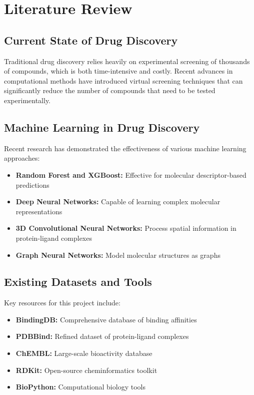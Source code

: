 \documentclass[12pt,a4paper]{article}
\begin{document}
\section{Literature Review}

\subsection{Current State of Drug Discovery}
Traditional drug discovery relies heavily on experimental screening of thousands of compounds, which is both time-intensive and costly. Recent advances in computational methods have introduced virtual screening techniques that can significantly reduce the number of compounds that need to be tested experimentally.

\subsection{Machine Learning in Drug Discovery}
Recent research has demonstrated the effectiveness of various machine learning approaches:
\begin{itemize}
    \item \textbf{Random Forest and XGBoost:} Effective for molecular descriptor-based predictions
    \item \textbf{Deep Neural Networks:} Capable of learning complex molecular representations
    \item \textbf{3D Convolutional Neural Networks:} Process spatial information in protein-ligand complexes
    \item \textbf{Graph Neural Networks:} Model molecular structures as graphs
\end{itemize}

\subsection{Existing Datasets and Tools}
Key resources for this project include:
\begin{itemize}
    \item \textbf{BindingDB:} Comprehensive database of binding affinities
    \item \textbf{PDBBind:} Refined dataset of protein-ligand complexes
    \item \textbf{ChEMBL:} Large-scale bioactivity database
    \item \textbf{RDKit:} Open-source cheminformatics toolkit
    \item \textbf{BioPython:} Computational biology tools
\end{itemize}
\end{document}
